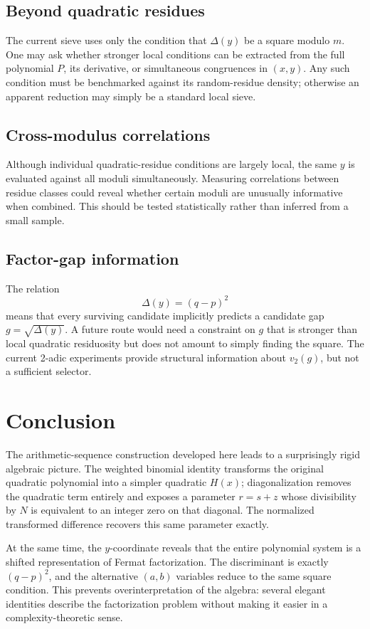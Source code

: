 \documentclass[11pt,a4paper]{article}
\newcommand{\vp}{v_2}
\begin{document}
\subsection{Beyond quadratic residues}
The current sieve uses only the condition that \(\Delta(y)\) be a square modulo \(m\). One may ask whether stronger local conditions can be extracted from the full polynomial \(P\), its derivative, or simultaneous congruences in \((x,y)\). Any such condition must be benchmarked against its random-residue density; otherwise an apparent reduction may simply be a standard local sieve.

\subsection{Cross-modulus correlations}
Although individual quadratic-residue conditions are largely local, the same \(y\) is evaluated against all moduli simultaneously. Measuring correlations between residue classes could reveal whether certain moduli are unusually informative when combined. This should be tested statistically rather than inferred from a small sample.

\subsection{Factor-gap information}
The relation
\[
\Delta(y)=(q-p)^2
\]
means that every surviving candidate implicitly predicts a candidate gap \(g=\sqrt{\Delta(y)}\). A future route would need a constraint on \(g\) that is stronger than local quadratic residuosity but does not amount to simply finding the square. The current 2-adic experiments provide structural information about \(\vp(g)\), but not a sufficient selector.

\section{Conclusion}
\label{sec:conclusion}

The arithmetic-sequence construction developed here leads to a surprisingly rigid algebraic picture. The weighted binomial identity transforms the original quadratic polynomial into a simpler quadratic \(H(x)\); diagonalization removes the quadratic term entirely and exposes a parameter \(r=s+z\) whose divisibility by \(N\) is equivalent to an integer zero on that diagonal. The normalized transformed difference recovers this same parameter exactly.

At the same time, the \(y\)-coordinate reveals that the entire polynomial system is a shifted representation of Fermat factorization. The discriminant is exactly \((q-p)^2\), and the alternative \((a,b)\) variables reduce to the same square condition. This prevents overinterpretation of the algebra: several elegant identities describe the factorization problem without making it easier in a complexity-theoretic sense.
\end{document}
